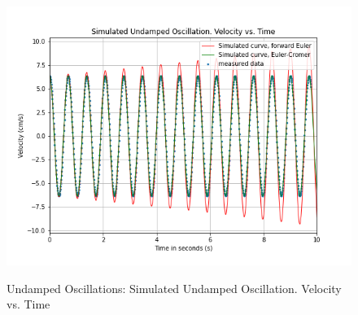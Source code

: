 \documentclass[letterpaper,12pt]{article}
\begin{document}
\begin{figure}[H]
  \centering
  \includegraphics[width=0.95\linewidth]{../Fredrik/Simulated Undamped Oscillation. Velocity vs. Time.png}    
  \begin{center}
    \emph{}
  \end{center}
  \caption{Undamped Oscillations: Simulated Undamped Oscillation. Velocity vs. Time}
  \label{undamped-sim-v-t-plot}
\end{figure}
\end{document}
